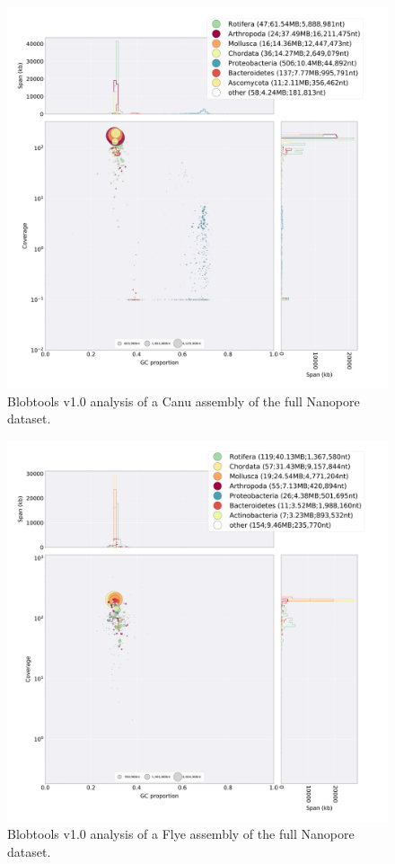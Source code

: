    \begin{figure}[ht]
    \centering
     \includegraphics[width=15cm]{fig/benchmark/ONT_CANU.png}
   \caption{Blobtools v1.0 analysis of a Canu assembly of the full Nanopore dataset.}
   \label{fig:blobtools_canu_ont}
 \end{figure}
 
   \begin{figure}[ht]
    \centering
     \includegraphics[width=15cm]{fig/benchmark/ONT_FLYE.png}
   \caption{Blobtools v1.0 analysis of a Flye assembly of the full Nanopore dataset.}
   \label{fig:blobtools_flye_ont}
 \end{figure}

